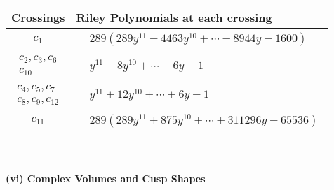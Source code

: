 \documentclass[1p]{elsarticle_modified}
\theoremstyle{definition}
\begin{document}
\begin{tabular}{m{50pt}|m{274pt}}
Crossings & \hspace{64pt}Riley Polynomials at each crossing \\
\hline $$\begin{aligned}c_{1}\end{aligned}$$&$\begin{aligned}
&289(289 y^{11}-4463 y^{10}+\cdots-8944 y-1600)
\end{aligned}$\\
\hline $$\begin{aligned}c_{2},c_{3},c_{6}\\c_{10}\end{aligned}$$&$\begin{aligned}
&y^{11}-8 y^{10}+\cdots-6 y-1
\end{aligned}$\\
\hline $$\begin{aligned}c_{4},c_{5},c_{7}\\c_{8},c_{9},c_{12}\end{aligned}$$&$\begin{aligned}
&y^{11}+12 y^{10}+\cdots+6 y-1
\end{aligned}$\\
\hline $$\begin{aligned}c_{11}\end{aligned}$$&$\begin{aligned}
&289(289 y^{11}+875 y^{10}+\cdots+311296 y-65536)
\end{aligned}$\\
\hline
\end{tabular}\\~\\
\newpage\flushleft \textbf{(vi) Complex Volumes and Cusp Shapes}
\end{document}
